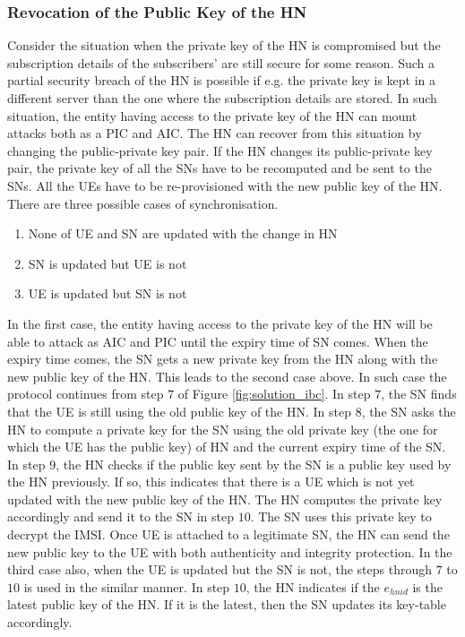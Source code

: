 \documentclass[runningheads,a4paper]{llncs} %
\begin{document}
\subsubsection{Revocation of the Public Key of the HN}
Consider the situation when the private key of the HN is compromised but the subscription details of the subscribers' are still secure for some reason. Such a partial security breach of the HN is possible if e.g. the private key is kept in a different server than the one where the subscription details are stored. In such situation, the entity having access to the private key of the HN can mount attacks both as a PIC and AIC. The HN can recover from this situation by changing the public-private key pair. If the HN changes its public-private key pair, the private key of all the SNs have to be recomputed and be sent to the SNs. All the UEs have to be re-provisioned with the new public key of the HN. There are three possible cases of synchronisation.
\begin{enumerate}
\item None of UE and SN are updated with the change in HN
\item SN is updated but UE is not
\item UE is updated but SN is not
\end{enumerate} 

In the first case, the entity having access to the private key of the HN will be able to attack as AIC and PIC until the expiry time of SN comes. When the expiry time comes, the SN gets a new private key from the HN along with the new public key of the HN. This leads to the second case above. In such case the protocol continues from step $7$ of Figure \ref{fig:solution_ibc}. In step $7$, the SN finds that the UE is still using the old public key of the HN. In step $8$, the SN asks the HN to compute a private key for the SN using the old private key (the one for which the UE has the public key) of HN and the current expiry time of the SN. In step $9$, the HN checks if the public key sent by the SN is a public key used by the HN previously. If so, this indicates that there is a UE which is not yet updated with the new public key of the HN. The HN computes the private key accordingly and send it to the SN in step $10$. The SN uses this private key to decrypt the IMSI. Once UE is attached to a legitimate SN, the HN can send the new public key to the UE with both authenticity and integrity protection. In the third case also, when the UE is updated but the SN is not, the steps through $7$ to $10$ is used in the similar manner. In step $10$, the HN indicates if the $e_{hnid}$ is the latest public key of the HN. If it is the latest, then the SN updates its key-table accordingly.
\end{document}
